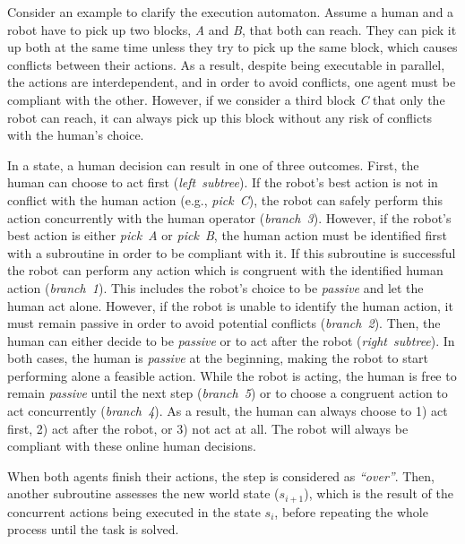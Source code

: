 

Consider an example to clarify the execution automaton. 
Assume a human and a robot have to pick up two blocks, \textit{A} and \textit{B}, that both can reach. 
They can pick it up both at the same time unless they try to pick up the same block, which causes conflicts between their actions. 
As a result, despite being executable in parallel, the actions are interdependent, and in order to avoid conflicts, one agent must be compliant with the other. 
However, if we consider a third block \textit{C} that only the robot can reach, it can always pick up this block without any risk of conflicts with the human's choice. 

In a state, a human decision can result in one of three outcomes.
First, the human can choose to act first (\textit{left~subtree}).
If the robot's best action is not in conflict with the human action (e.g., \textit{pick~C}), the robot can safely perform this action concurrently with the human operator (\textit{branch~3}).
However, if the robot's best action is either \textit{pick~A} or \textit{pick~B}, the human action must be identified first with a subroutine in order to be compliant with it.
If this subroutine is successful the robot can perform any action which is congruent with the identified human action (\textit{branch~1}). 
This includes the robot's choice to be \textit{passive} and let the human act alone. 
However, if the robot is unable to identify the human action, it must remain passive in order to avoid potential conflicts (\textit{branch~2}). 
Then, the human can either decide to be \textit{passive} or to act after the robot (\textit{right~subtree}). 
In both cases, the human is \textit{passive} at the beginning, making the robot to start performing alone a feasible action. 
While the robot is acting, the human is free to remain \textit{passive} until the next step (\textit{branch~5}) or to choose a congruent action to act concurrently (\textit{branch~4}). 
As a result, the human can always choose to 1) act first, 2) act after the robot, or 3) not act at all. 
The robot will always be compliant with these online human decisions.

When both agents finish their actions, the step is considered as \textit{``over''}. 
Then, another subroutine assesses the new world state ($s_{i+1}$), which is the result of the concurrent actions being executed in the state $s_i$, before repeating the whole process until the task is solved.

